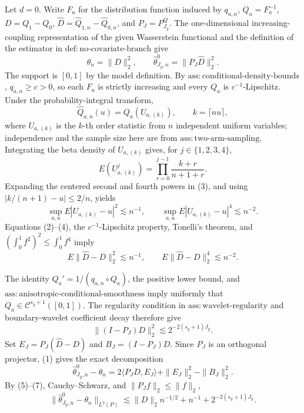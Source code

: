 Let \(d=0\). Write \(F_a\) for the distribution function induced by \(q_{a,n}\), \(Q_a=F_a^{-1}\), \(D=Q_1-Q_0\), \(\widehat D=\widehat Q_{1,n}-\widehat Q_{0,n}\), and \(P_J=P^Q_{J_y}\). The one-dimensional increasing-coupling representation of the given Wasserstein functional and the definition of the estimator in \(\mathrm{def{:}no\text{-}covariate\text{-}branch}\) give
\[
\theta_n=\|D\|_2^2,
\qquad
\widehat\theta^0_{J_y,n}=\|P_J\widehat D\|_2^2. \tag{1}
\]
The support is \([0,1]\) by the model definition. By \(\mathrm{ass{:}conditional\text{-}density\text{-}bounds}\), \(q_{a,n}\ge c>0\), so each \(F_a\) is strictly increasing and every \(Q_a\) is \(c^{-1}\)-Lipschitz. Under the probability-integral transform,
\[
\widehat Q_{a,n}(u)=Q_a(U_{a,(k)}),
\qquad k=\lceil nu\rceil, \tag{2}
\]
where \(U_{a,(k)}\) is the \(k\)-th order statistic from \(n\) independent uniform variables; independence and the sample size here are from \(\mathrm{ass{:}two\text{-}arm\text{-}sampling}\). Integrating the beta density of \(U_{a,(k)}\) gives, for \(j\in\{1,2,3,4\}\),
\[
E(U_{a,(k)}^j)=\prod_{r=0}^{j-1}\frac{k+r}{n+1+r}. \tag{3}
\]
Expanding the centered second and fourth powers in (3), and using \(|k/(n+1)-u|\le2/n\), yields
\[
\sup_{a,u}E|U_{a,(k)}-u|^2\lesssim n^{-1},
\qquad
\sup_{a,u}E|U_{a,(k)}-u|^4\lesssim n^{-2}. \tag{4}
\]
Equations (2)--(4), the \(c^{-1}\)-Lipschitz property, Tonelli's theorem, and \((\int_0^1 f^2)^2\le\int_0^1 f^4\) imply
\[
E\|\widehat D-D\|_2^2\lesssim n^{-1},
\qquad
E\|\widehat D-D\|_2^4\lesssim n^{-2}. \tag{5}
\]

The identity \(Q_a'=1/(q_{a,n}\circ Q_a)\), the positive lower bound, and \(\mathrm{ass{:}anisotropic\text{-}conditional\text{-}smoothness}\) imply uniformly that \(Q_a\in\mathcal C^{s_y+1}([0,1])\). The regularity condition in \(\mathrm{ass{:}wavelet\text{-}regularity}\) and boundary-wavelet coefficient decay therefore give
\[
\|(I-P_J)D\|_2^2\lesssim2^{-2(s_y+1)J_y}. \tag{6}
\]
Set \(E_J=P_J(\widehat D-D)\) and \(B_J=(I-P_J)D\). Since \(P_J\) is an orthogonal projector, (1) gives the exact decomposition
\[
\widehat\theta^0_{J_y,n}-\theta_n
=2\langle P_JD,E_J\rangle+\|E_J\|_2^2-\|B_J\|_2^2. \tag{7}
\]
By (5)--(7), Cauchy--Schwarz, and \(\|P_Jf\|_2\le\|f\|_2\),
\[
\|\widehat\theta^0_{J_y,n}-\theta_n\|_{L^2(P)}
\lesssim\|D\|_2n^{-1/2}+n^{-1}+2^{-2(s_y+1)J_y}. \tag{8}
\]

